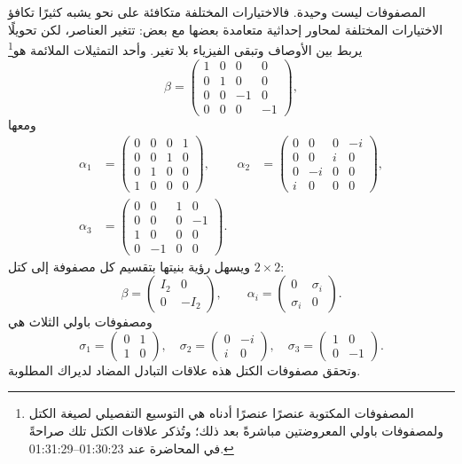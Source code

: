 المصفوفات ليست وحيدة. فالاختيارات المختلفة متكافئة على نحو يشبه كثيرًا تكافؤ الاختيارات المختلفة لمحاور إحداثية متعامدة بعضها مع بعض: تتغير العناصر، لكن تحويلًا يربط بين الأوصاف وتبقى الفيزياء بلا تغير. وأحد التمثيلات الملائمة هو\footnote{المصفوفات المكتوبة عنصرًا عنصرًا أدناه هي التوسيع التفصيلي لصيغة الكتل ولمصفوفات باولي المعروضتين مباشرةً بعد ذلك؛ وتُذكر علاقات الكتل تلك صراحةً في المحاضرة عند 01:30:23--01:31:29.}
\begin{equation}
\beta=
\begin{pmatrix}
1&0&0&0\\
0&1&0&0\\
0&0&-1&0\\
0&0&0&-1
\end{pmatrix},
\end{equation}
ومعها
\begin{align}
\alpha_1&=
\begin{pmatrix}
0&0&0&1\\
0&0&1&0\\
0&1&0&0\\
1&0&0&0
\end{pmatrix},
&
\alpha_2&=
\begin{pmatrix}
0&0&0&-i\\
0&0&i&0\\
0&-i&0&0\\
i&0&0&0
\end{pmatrix},
\\[1ex]
\alpha_3&=
\begin{pmatrix}
0&0&1&0\\
0&0&0&-1\\
1&0&0&0\\
0&-1&0&0
\end{pmatrix}.
\end{align}
ويسهل رؤية بنيتها بتقسيم كل مصفوفة إلى كتل \(2\times2\):
\begin{equation}
\beta=
\begin{pmatrix}
I_2&0\\
0&-I_2
\end{pmatrix},
\qquad
\alpha_i=
\begin{pmatrix}
0&\sigma_i\\
\sigma_i&0
\end{pmatrix}.
\end{equation}
ومصفوفات باولي الثلاث هي
\begin{equation}
\sigma_1=
\begin{pmatrix}
0&1\\
1&0
\end{pmatrix},
\quad
\sigma_2=
\begin{pmatrix}
0&-i\\
i&0
\end{pmatrix},
\quad
\sigma_3=
\begin{pmatrix}
1&0\\
0&-1
\end{pmatrix}.
\end{equation}
وتحقق مصفوفات الكتل هذه علاقات التبادل المضاد لديراك المطلوبة.

